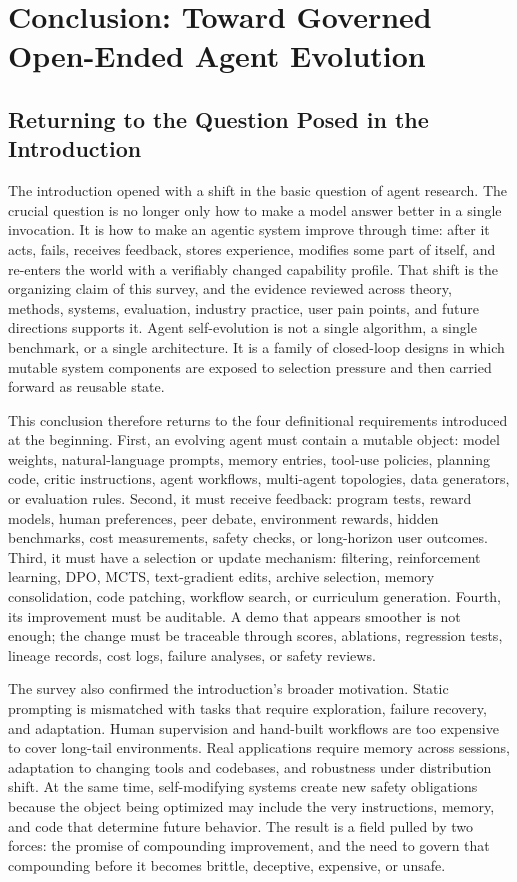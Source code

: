 \section{Conclusion: Toward Governed Open-Ended Agent Evolution}
\label{sec:conclusion}

\subsection{Returning to the Question Posed in the Introduction}

The introduction opened with a shift in the basic question of agent research. The crucial question is no longer only how to make a model answer better in a single invocation. It is how to make an agentic system improve through time: after it acts, fails, receives feedback, stores experience, modifies some part of itself, and re-enters the world with a verifiably changed capability profile. That shift is the organizing claim of this survey, and the evidence reviewed across theory, methods, systems, evaluation, industry practice, user pain points, and future directions supports it. Agent self-evolution is not a single algorithm, a single benchmark, or a single architecture. It is a family of closed-loop designs in which mutable system components are exposed to selection pressure and then carried forward as reusable state.

This conclusion therefore returns to the four definitional requirements introduced at the beginning. First, an evolving agent must contain a mutable object: model weights, natural-language prompts, memory entries, tool-use policies, planning code, critic instructions, agent workflows, multi-agent topologies, data generators, or evaluation rules. Second, it must receive feedback: program tests, reward models, human preferences, peer debate, environment rewards, hidden benchmarks, cost measurements, safety checks, or long-horizon user outcomes. Third, it must have a selection or update mechanism: filtering, reinforcement learning, DPO, MCTS, text-gradient edits, archive selection, memory consolidation, code patching, workflow search, or curriculum generation. Fourth, its improvement must be auditable. A demo that appears smoother is not enough; the change must be traceable through scores, ablations, regression tests, lineage records, cost logs, failure analyses, or safety reviews.

The survey also confirmed the introduction's broader motivation. Static prompting is mismatched with tasks that require exploration, failure recovery, and adaptation. Human supervision and hand-built workflows are too expensive to cover long-tail environments. Real applications require memory across sessions, adaptation to changing tools and codebases, and robustness under distribution shift. At the same time, self-modifying systems create new safety obligations because the object being optimized may include the very instructions, memory, and code that determine future behavior. The result is a field pulled by two forces: the promise of compounding improvement, and the need to govern that compounding before it becomes brittle, deceptive, expensive, or unsafe.

